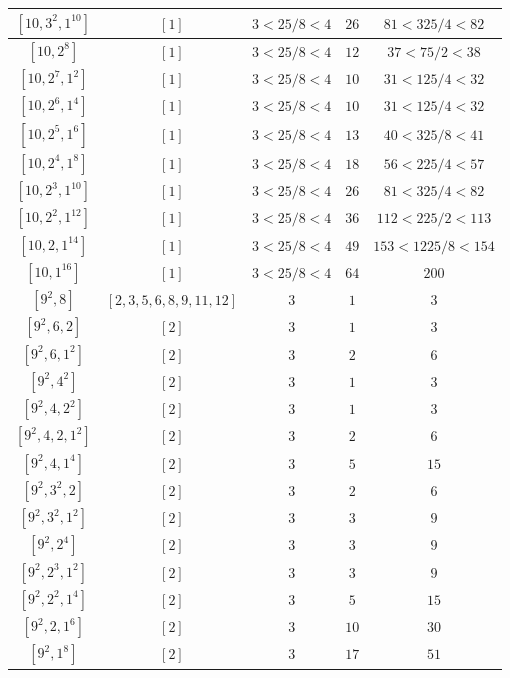 \documentclass{article}%
\begin{document}
\begin{center}
\begin{longtable}{||c|c|c|c|c||}
$[10, 3^{2}, 1^{10}]$ & $[1]$ & $3 < 25/8 < 4$ & $26$ & $81 < 325/4 < 82$ \\ \hline 
$[10, 2^{8}]$ & $[1]$ & $3 < 25/8 < 4$ & $12$ & $37 < 75/2 < 38$ \\ \hline 
$[10, 2^{7}, 1^{2}]$ & $[1]$ & $3 < 25/8 < 4$ & $10$ & $31 < 125/4 < 32$ \\ \hline 
$[10, 2^{6}, 1^{4}]$ & $[1]$ & $3 < 25/8 < 4$ & $10$ & $31 < 125/4 < 32$ \\ \hline 
$[10, 2^{5}, 1^{6}]$ & $[1]$ & $3 < 25/8 < 4$ & $13$ & $40 < 325/8 < 41$ \\ \hline 
$[10, 2^{4}, 1^{8}]$ & $[1]$ & $3 < 25/8 < 4$ & $18$ & $56 < 225/4 < 57$ \\ \hline 
$[10, 2^{3}, 1^{10}]$ & $[1]$ & $3 < 25/8 < 4$ & $26$ & $81 < 325/4 < 82$ \\ \hline 
$[10, 2^{2}, 1^{12}]$ & $[1]$ & $3 < 25/8 < 4$ & $36$ & $112 < 225/2 < 113$ \\ \hline 
$[10, 2, 1^{14}]$ & $[1]$ & $3 < 25/8 < 4$ & $49$ & $153 < 1225/8 < 154$ \\ \hline 
$[10, 1^{16}]$ & $[1]$ & $3 < 25/8 < 4$ & $64$ & $200$ \\ \hline 
$[9^{2}, 8]$ & $[2, 3, 5, 6, 8, 9, 11, 12]$ & $3$ & $1$ & $3$ \\ \hline 
$[9^{2}, 6, 2]$ & $[2]$ & $3$ & $1$ & $3$ \\ \hline 
$[9^{2}, 6, 1^{2}]$ & $[2]$ & $3$ & $2$ & $6$ \\ \hline 
$[9^{2}, 4^{2}]$ & $[2]$ & $3$ & $1$ & $3$ \\ \hline 
$[9^{2}, 4, 2^{2}]$ & $[2]$ & $3$ & $1$ & $3$ \\ \hline 
$[9^{2}, 4, 2, 1^{2}]$ & $[2]$ & $3$ & $2$ & $6$ \\ \hline 
$[9^{2}, 4, 1^{4}]$ & $[2]$ & $3$ & $5$ & $15$ \\ \hline 
$[9^{2}, 3^{2}, 2]$ & $[2]$ & $3$ & $2$ & $6$ \\ \hline 
$[9^{2}, 3^{2}, 1^{2}]$ & $[2]$ & $3$ & $3$ & $9$ \\ \hline 
$[9^{2}, 2^{4}]$ & $[2]$ & $3$ & $3$ & $9$ \\ \hline 
$[9^{2}, 2^{3}, 1^{2}]$ & $[2]$ & $3$ & $3$ & $9$ \\ \hline 
$[9^{2}, 2^{2}, 1^{4}]$ & $[2]$ & $3$ & $5$ & $15$ \\ \hline 
$[9^{2}, 2, 1^{6}]$ & $[2]$ & $3$ & $10$ & $30$ \\ \hline 
$[9^{2}, 1^{8}]$ & $[2]$ & $3$ & $17$ & $51$ \\ \hline 

\end{longtable}
\end{center}
\end{document}

